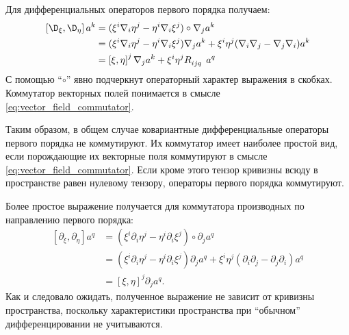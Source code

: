         Для дифференциальных операторов первого порядка получаем:
        \begin{equation}\begin{aligned}
            \left[ \D_\xi, \D_\eta \right] a^k
                &= (\xi^i \nabla_i \eta^j - \eta^i \nabla_i \xi^j) \circ \nabla_j a^k \\
                &= (\xi^i \nabla_i \eta^j - \eta^i \nabla_i \xi^j) \nabla_j a^k
                    + \xi^i \eta^j (\nabla_i \nabla_j - \nabla_j \nabla_i) a^k \\
                &= \left[ \xi, \eta \right]^j \nabla_j a^k
                    + \xi^i \eta^j R_{ijq}^{\hphantom{ijqk}} a^q
        \end{aligned}\end{equation}
        С помощью \enquote{$\circ$} явно подчеркнут операторный характер выражения в скобках. Коммутатор векторных полей понимается в смысле \autoref{eq:vector_field_commutator}.

        Таким образом, в общем случае ковариантные дифференциальные операторы первого порядка не коммутируют. Их коммутатор имеет наиболее простой вид, если порождающие их векторные поля коммутируют в смысле \autoref{eq:vector_field_commutator}. Если кроме этого тензор кривизны всюду в пространстве равен нулевому тензору, операторы первого порядка коммутируют.

        Более простое выражение получается для коммутатора производных по направлению первого порядка:
        \begin{equation}\begin{aligned}
            \left[ \partial_\xi, \partial_\eta \right] a^q
                &= (\xi^i \partial_i \eta^j - \eta^i \partial_i \xi^j) \circ \partial_j a^q \\
                &= (\xi^i \partial_i \eta^j - \eta^i \partial_i \xi^j) \partial_j a^q
                    + \xi^i \eta^j (\partial_i \partial_j - \partial_j \partial_i) a^q \\
                &= \left[ \xi, \eta \right]^j \partial_j a^q .
        \end{aligned}\end{equation}
        Как и следовало ожидать, полученное выражение не зависит от кривизны пространства, поскольку характеристики пространства при \enquote{обычном} дифференцировании не учитываются.


